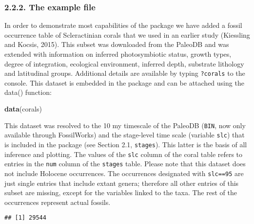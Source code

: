 \documentclass[]{article}
\newenvironment{Shaded}{\begin{snugshade}}{\end{snugshade}}
\newcommand{\CommentTok}[1]{\textcolor[rgb]{0.56,0.35,0.01}{\textit{#1}}}
\newcommand{\DecValTok}[1]{\textcolor[rgb]{0.00,0.00,0.81}{#1}}
\newcommand{\KeywordTok}[1]{\textcolor[rgb]{0.13,0.29,0.53}{\textbf{#1}}}
\newcommand{\NormalTok}[1]{#1}
\newcommand{\OperatorTok}[1]{\textcolor[rgb]{0.81,0.36,0.00}{\textbf{#1}}}
\newcommand{\StringTok}[1]{\textcolor[rgb]{0.31,0.60,0.02}{#1}}
\begin{document}
\hypertarget{the-example-file}{%
\subsubsection{2.2.2. The example file}\label{the-example-file}}

In order to demonstrate most capabilities of the package we have added a
fossil occurrence table of Scleractinian corals that we used in an
earlier study (Kiessling and Kocsis, 2015). This subset was downloaded
from the PaleoDB and was extended with information on inferred
photosymbiotic status, growth types, degree of integration, ecological
environment, inferred depth, substrate lithology and latitudinal groups.
Additional details are available by typing \texttt{?corals} to the
console. This dataset is embedded in the package and can be attached
using the data() function:

\begin{Shaded}
\begin{Highlighting}[]
\KeywordTok{data}\NormalTok{(corals)}
\end{Highlighting}
\end{Shaded}

This dataset was resolved to the 10 my timescale of the PaleoDB
(\texttt{BIN}, now only available through FossilWorks) and the
stage-level time scale (variable \texttt{slc}) that is included in the
package (see Section 2.1, \texttt{stages}). This latter is the basis of
all inference and plotting. The values of the \texttt{slc} column of the
coral table refers to entries in the \texttt{num} column of the
\texttt{stages} table. Please note that this dataset does not include
Holocene occurrences. The occurrences designated with \texttt{slc==95}
are just single entries that include extant genera; therefore all other
entries of this subset are missing, except for the variables linked to
the taxa. The rest of the occurrences represent actual fossils.

\begin{Shaded}
\end{Shaded}

\begin{verbatim}
## [1] 29544
\end{verbatim}
\end{document}
